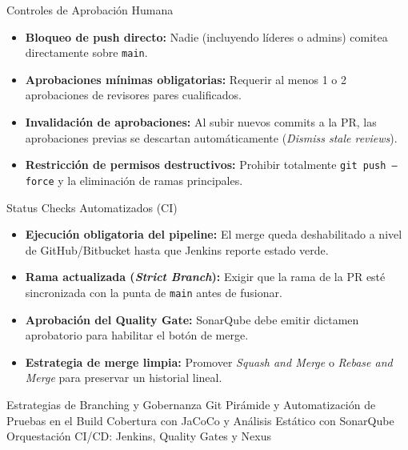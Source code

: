 \documentclass[aspectratio=169]{beamer}
\begin{document}
  {Controles de Aprobación Humana}
  {
    {\footnotesize
    \begin{itemize}
      \setlength{\itemsep}{2pt}
      \item \textbf{Bloqueo de push directo:} Nadie (incluyendo líderes o admins) comitea directamente sobre \texttt{main}.
      \item \textbf{Aprobaciones mínimas obligatorias:} Requerir al menos 1 o 2 aprobaciones de revisores pares cualificados.
      \item \textbf{Invalidación de aprobaciones:} Al subir nuevos commits a la PR, las aprobaciones previas se descartan automáticamente (\textit{Dismiss stale reviews}).
      \item \textbf{Restricción de permisos destructivos:} Prohibir totalmente \texttt{git push --force} y la eliminación de ramas principales.
    \end{itemize}
    }
  }
  {Status Checks Automatizados (CI)}
  {
    {\footnotesize
    \begin{itemize}
      \setlength{\itemsep}{2pt}
      \item \textbf{Ejecución obligatoria del pipeline:} El merge queda deshabilitado a nivel de GitHub/Bitbucket hasta que Jenkins reporte estado verde.
      \item \textbf{Rama actualizada (\textit{Strict Branch}):} Exigir que la rama de la PR esté sincronizada con la punta de \texttt{main} antes de fusionar.
      \item \textbf{Aprobación del Quality Gate:} SonarQube debe emitir dictamen aprobatorio para habilitar el botón de merge.
      \item \textbf{Estrategia de merge limpia:} Promover \textit{Squash and Merge} o \textit{Rebase and Merge} para preservar un historial lineal.
    \end{itemize}
    }
  }

  {Estrategias de Branching y Gobernanza Git}
  {Pirámide y Automatización de Pruebas en el Build}
  {Cobertura con JaCoCo y Análisis Estático con SonarQube}
  {Orquestación CI/CD: Jenkins, Quality Gates y Nexus}
\end{document}

